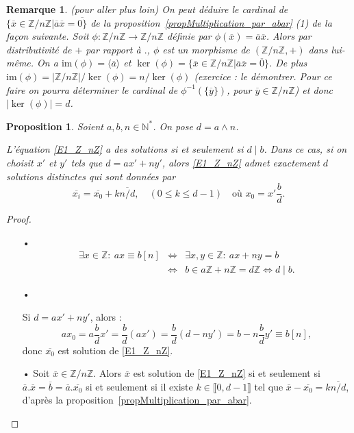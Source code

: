 \documentclass[12pt]{report}
\newtheorem*{rem}{Remarque}
\newtheorem{Prop}[thm]{Proposition}
\newcommand{\Z}{\mathbb{Z}}
\begin{document}
\begin{rem}(pour aller plus loin) On peut déduire le cardinal de $\{\overline{x}\in \Z/n\Z|\overline{a}\overline{x}=\overline{0\}}$ de la proposition~\ref{propMultiplication_par_abar}  (1) de la façon suivante. Soit $\phi:\Z/n\Z\rightarrow \Z/n\Z$ définie par  $\phi(\overline{x})=\overline{a}\overline{x}$. Alors par distributivité de $+$ par rapport à $.$, $\phi$ est un morphisme de $(\Z/n\Z,+)$ dans lui-même. On a $\mathrm{im}(\phi)=\langle \overline{a}\rangle$ et $\ker(\phi)=\{\overline{x}\in \Z/n\Z|\overline{a}\overline{x}=\overline{0}\}$. De plus $\mathrm{im}(\phi)=|\Z/n\Z|/\ker(\phi)=n/\ker(\phi)$ (exercice : le démontrer.  Pour ce faire on pourra déterminer le cardinal de $\phi^{-1}(\{\overline{y}\})$, pour $\overline{y}\in \Z/n\Z$) et donc $|\ker(\phi)|=d$.

\end{rem}

\begin{Prop}
Soient $a,b,n \in \mathbb{N}^*$. On pose $d=a\wedge n$. \par 
L'équation \eqref{E1_Z_nZ} a des solutions si et seulement si $d \mid b$. Dans ce cas, si on choisit $x'$ et $y'$ tels que $d=ax'+ny'$, alors \eqref{E1_Z_nZ} admet exactement $d$ solutions distinctes qui sont données par 
$$ \overline{x_i}=\overline{x_0} +k\overline{n/d}, \quad (0 \leq k \leq d-1) \quad \text{où  } x_0=x'\frac{b}{d}.      $$
\end{Prop}

\begin{proof}\
\begin{itemize}
\item[•]
\begin{eqnarray*}
\exists x \in \mathbb{Z}:\ ax \equiv b [n] & \Longleftrightarrow & \exists x,y \in \mathbb{Z}: \ ax+ny=b \\
  & \Longleftrightarrow & b \in a \mathbb{Z}+n \mathbb{Z}=d \mathbb{Z} \Longleftrightarrow d \mid b.
\end{eqnarray*}
\item[•] \par 
Si $d=ax'+ny'$, alors  :  \[a x_0=a\frac{b}{d} x'=\frac{b}{d}(ax')=\frac{b}{d}(d-ny')=b-n\frac{b}{d}y'\equiv b[n],\] donc $\overline{x_0}$ est solution de \eqref{E1_Z_nZ}.

\item[•] Soit $\overline{x}\in \Z/n\Z$. Alors $\overline{x}$ est solution de \eqref{E1_Z_nZ} si et seulement si $\overline{a}.\overline{x}=\overline{b}=\overline{a}.\overline{x_0}$ si et seulement si il existe $k\in \llbracket 0,d-1\rrbracket$ tel que $\overline{x}-\overline{x_0}=k\overline{n/d}$,  d'après  la proposition~\ref{propMultiplication_par_abar}.
\end{itemize}
\end{proof}
\end{document}
